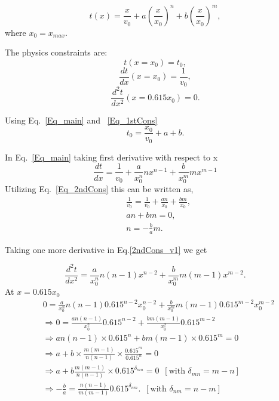\documentclass[12pt]{article}
\begin{document}
\begin{equation}\label{Eq_main}
 \boxed{ t(x) = \frac{x}{v_0} + a(\frac{x}{x_0})^n + b (\frac{x}{x_0})^m},
\end{equation}
where $x_0 = x_{max}$.

The physics constraints are:
\begin{equation}\label{Eq_1stCons}
 t(x = x_0) = t_0,
 \end{equation}
\begin{equation}\label{Eq_2ndCons}
 \frac{dt}{dx} (x = x_0) = \frac{1}{v_0},
\end{equation}
 \begin{equation}\label{Eq_3rdCons}
 \frac{d^2t}{dx^2} ( x = 0.615x_0) = 0.
 \end{equation}
 
 Using Eq.~\ref{Eq_main} and ~\ref{Eq_1stCons}
 \begin{equation}\label{1stCons}
 t_0 = \frac{x_0}{v_0} + a + b.
 \end{equation}
 
 In Eq.~\ref{Eq_main} taking first derivative with respect to x
 \begin{equation}\label{2ndCons_v1}
 \frac{dt}{dx} = \frac{1}{v_0} + \frac{a}{x_0^n}nx^{n-1} + \frac{b}{x^m_0}mx^{m-1} 
 \end{equation}
 Utilizing Eq.~\ref{Eq_2ndCons} this can be written as,
\begin{equation}\label{2ndCons_v2}
\begin{split}
& \frac{1}{v_0} = \frac{1}{v_0} +\frac{an}{x_0} + \frac{bm}{x_0},\\
& an + bm = 0,\\
& n = - \frac{b}{a}m .
 \end{split}
\end{equation}

Taking one more derivative in Eq.\ref{2ndCons_v1} we get 
 
\begin{equation}\label{3rdCons_v1}
\frac{d^2t}{dx^2} = \frac{a}{x^n_0}n(n-1)x^{n-2} + \frac{b}{x_0^m}m(m-1)x^{m-2}.  
\end{equation}
 At $x = 0.615x_0$
 \begin{equation}\label{3rdCons_v2}
 \begin{split}
 & 0  = \frac{a}{x_0^n}n(n-1) 0.615^{n-2}x_0^{n-2} + \frac{b}{x_0^m}m(m-1)0.615^{m-2}x_0^{m-2}\\
&\Rightarrow 0 = \frac{an(n-1)}{x_0^2}0.615^{n-2} + \frac{bm(m-1)}{x_0^2}0.615^{m-2} \\
&\Rightarrow an(n-1)\times 0.615^n + bm(m-1)\times 0.615^m = 0\\
&\Rightarrow a + b \times \frac{m(m-1)}{n(n-1)}\times \frac {0.615^m}{0.615^n} =0 \\
&\Rightarrow a + b \frac{m(m-1)}{n(n-1)}\times 0.615^{\delta_{mn}} = 0 \,\,\,[\textrm{with}\,\, \delta_{mn} = m - n] \\
&\Rightarrow -\frac{b}{a} = \frac{n(n-1)}{m(m-1)}0.615^{\delta_{nm}}. \,\,\,[\textrm{with}\,\, \delta_{nm} = n - m ] 
\end{split}
\end{equation}
\end{document}
